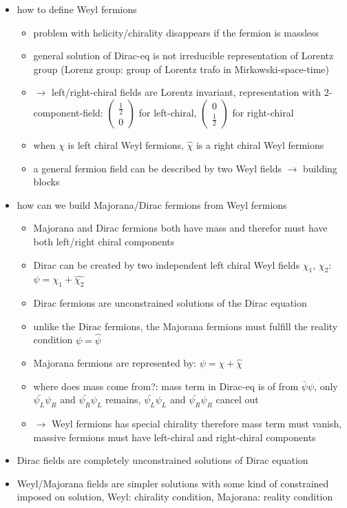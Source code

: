 \begin{itemize}
\begin{itemize}
\end{itemize}
\item how to define Weyl fermions
\begin{itemize}
\item problem with helicity/chirality disappears if the fermion is massless
\item general solution of Dirac-eq is not irreducible representation of Lorentz group (Lorenz group: group of Lorentz trafo in Mirkowski-space-time)
\item \(\rightarrow\) left/right-chiral fields are Lorentz invariant, representation with 2-component-field: \( \begin{pmatrix}\frac{1}{2} \\ 0\end{pmatrix}\) for left-chiral, \(\begin{pmatrix}0 \\ \frac{1}{2}\end{pmatrix}\) for right-chiral
\item when \(\chi\) is left chiral Weyl fermions, \( \widehat{\chi} \) is a right chiral Weyl fermions
\item a general fermion field can be described by two Weyl fields \(\rightarrow\) building blocks
\end{itemize}
\item how can we build Majorana/Dirac fermions from Weyl fermions
\begin{itemize}
\item Majorana and Dirac fermions both have mass and therefor must have both left/right chiral components
\item Dirac can be created by two independent left chiral Weyl fields \(\chi_1\), \(\chi_2\): \(\psi = \chi_1 + \widehat{\chi_2}\)
\item Dirac fermions are unconstrained solutions of the Dirac equation
\item unlike the Dirac fermions, the Majorana fermions must fulfill the reality condition \( \psi = \widehat{\psi} \)
\item Majorana fermions are represented by: \( \psi = \chi + \widehat{\chi} \)
\item where does mass come from?: mass term in Dirac-eq is of from \(\bar{\psi}\psi\), only \(\bar{\psi_L}\psi_R\) and \(\bar{\psi_R}\psi_L\) remains, \(\bar{\psi_L}\psi_L\) and \(\bar{\psi_R}\psi_R\) cancel out
\item \(\rightarrow\) Weyl fermions has special chirality therefore mass term must vanish, massive fermions must have left-chiral and right-chiral components
\end{itemize}
\item Dirac fields are completely unconstrained solutions of Dirac equation
\item Weyl/Majorana fields are simpler solutions with some kind of constrained imposed on solution, Weyl: chirality condition, Majorana: reality condition
\end{itemize}

